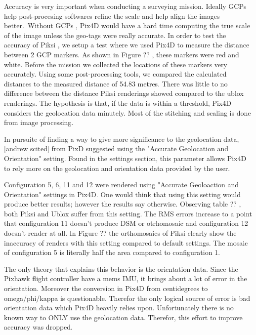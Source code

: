 \documentclass{article}
\begin{document}
Accuracy is very important when conducting a surveying mission. Ideally GCPs help post-procesing softwares refine the scale and help align the images better. Without GCPs , Pix4D would have a hard time computing the true scale of the image unless the geo-tags were really accurate. In order to test the accuracy of Piksi , we setup a test where we used Pix4D to measure the distance between 2 GCP markers. As shown in Figure ?? , these markers were red and white. Before the mission we collected the locations of these markers very accurately. Using some post-processing tools, we compared the calculated distances to the measured distance of 54.83 metres. There was little to no difference between the distance Piksi renderings showed compared to the ublox renderings. The hypothesis is that, if the data is within a threshold, Pix4D considers the geolocation data minutely. Most of the stitching and scaling is done from image processing.

In pursuite of finding a way to give more significance to the geolocation data, [andrew scited] from PixD suggested using the "Accurate Geolocation and Orientation" setting. Found in the settings section, this parameter allows Pix4D to rely more on the geolocation and orientation data provided by the user.

Configuration 5, 6, 11 and 12 were rendered using "Accurate Geoloaction and Orientation" settings in Pix4D. One would think that using this setting would produce better results; however the results say otherwise. Observing table ?? , both Piksi and Ublox suffer from this setting. The RMS errors increase to a point that configuration 11 doesn't produce DSM or otrhomosaic and configuration 12 doesn't render at all. In Figure ?? the orthomosaics of Piksi clearly show the inaccuracy of renders with this setting compared to default settings. The mosaic of configuration 5 is literally half the area compared to configuration 1.

The only theory that explains this behavior is the orientation data. Since the Pixhawk flight controller have a mems IMU, it brings about a lot of error in the orientation. Moreover the conversion in Pix4D from centidegrees to omega/phi/kappa is questionable. Therefor the only logical source of error is bad orientation data which Pix4D heavily relies upon. Unfortunately there is no known way to ONLY use the geolocation data. Therefor, this effort to improve accuracy was dropped.
\end{document}
